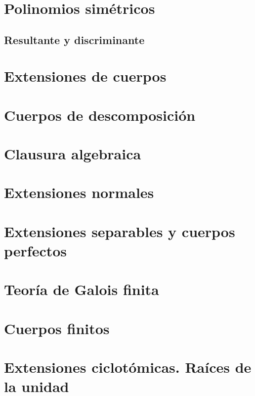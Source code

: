 \documentclass{article}
\theoremstyle{theorem-style}  %
\theoremstyle{definition-style}
\theoremstyle{example-style}
\begin{document}
\makeatletter\renewcommand{\ALG@name}{Algoritmo}

\maketitle



\newpage
\tableofcontents
\newpage

\section{Polinomios simétricos}


\subsection{Resultante y discriminante}

\pagebreak
\section{Extensiones de cuerpos}

\pagebreak
\section{Cuerpos de descomposición}

\pagebreak
\section{Clausura algebraica}

\pagebreak
\section{Extensiones normales}

\pagebreak
\section{Extensiones separables y cuerpos perfectos}

\pagebreak
\section{Teoría de Galois finita}

\pagebreak
\section{Cuerpos finitos}

\pagebreak
\section{Extensiones ciclotómicas. Raíces de la unidad}

\pagebreak
\printbibliography
\end{document}
